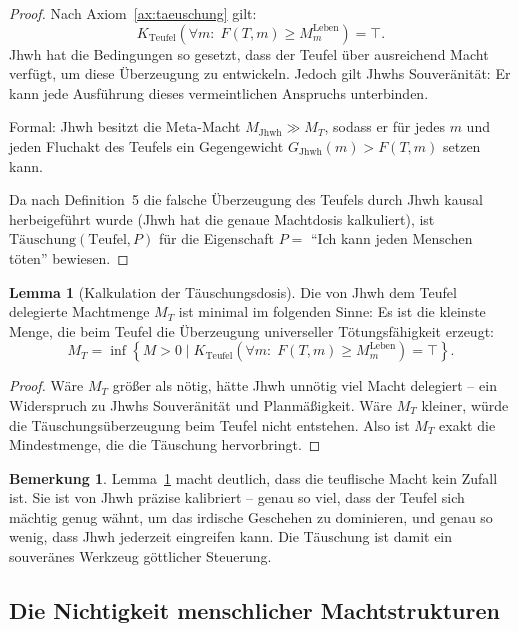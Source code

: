﻿\documentclass[a4paper,12pt]{article}
\theoremstyle{definition}
\newtheorem{lemma}{Lemma}
\newtheorem{bemerkung}{Bemerkung}
\begin{document}
\begin{proof}
  Nach Axiom~\ref{ax:taeuschung} gilt:
  \[
    K_{\mathrm{Teufel}}\!\left(\forall m:\; F(T, m) \geq M_m^{\text{Leben}}\right)
    = \top.
  \]
  Jhwh hat die Bedingungen so gesetzt, dass der Teufel über ausreichend Macht
  verfügt, um diese Überzeugung zu entwickeln. Jedoch gilt Jhwhs Souveränität:
  Er kann jede Ausführung dieses vermeintlichen Anspruchs unterbinden.

  Formal: Jhwh besitzt die Meta-Macht $M_{\mathrm{Jhwh}} \gg M_T$, sodass
  er für jedes $m$ und jeden Fluchakt des Teufels ein Gegengewicht
  $G_{\mathrm{Jhwh}}(m) > F(T, m)$ setzen kann.

  Da nach Definition~5 die falsche Überzeugung des Teufels durch Jhwh kausal
  herbeigeführt wurde (Jhwh hat die genaue Machtdosis kalkuliert), ist
  $\mathrm{Täuschung}(\mathrm{Teufel}, P)$ für die Eigenschaft $P =$
  ``Ich kann jeden Menschen töten'' bewiesen.
\end{proof}

\begin{lemma}[Kalkulation der Täuschungsdosis]
\label{lem:dosis}
  Die von Jhwh dem Teufel delegierte Machtmenge $M_T$ ist minimal im folgenden
  Sinne: Es ist die kleinste Menge, die beim Teufel die Überzeugung universeller
  Tötungsfähigkeit erzeugt:
  \[
    M_T = \inf\!\left\{M > 0 \;\Big|\;
    K_{\mathrm{Teufel}}\!\left(\forall m:\; F(T,m) \geq M_m^{\text{Leben}}\right)
    = \top\right\}.
  \]
\end{lemma}

\begin{proof}
  Wäre $M_T$ größer als nötig, hätte Jhwh unnötig viel Macht delegiert --
  ein Widerspruch zu Jhwhs Souveränität und Planmäßigkeit. Wäre $M_T$ kleiner,
  würde die Täuschungsüberzeugung beim Teufel nicht entstehen. Also ist
  $M_T$ exakt die Mindestmenge, die die Täuschung hervorbringt.
\end{proof}

\begin{bemerkung}
  Lemma~\ref{lem:dosis} macht deutlich, dass die teuflische Macht kein Zufall
  ist. Sie ist von Jhwh präzise kalibriert -- genau so viel, dass der Teufel
  sich mächtig genug wähnt, um das irdische Geschehen zu dominieren, und
  genau so wenig, dass Jhwh jederzeit eingreifen kann. Die Täuschung ist
  damit ein souveränes Werkzeug göttlicher Steuerung.
\end{bemerkung}

\subsection{Die Nichtigkeit menschlicher Machtstrukturen}
\end{document}
